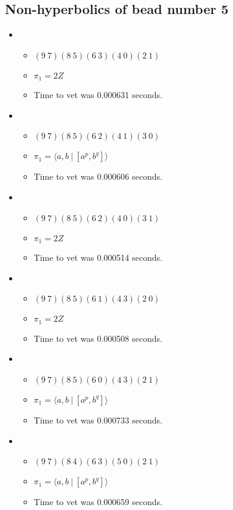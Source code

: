 \documentclass{article}
\begin{document}
\subsection{Non-hyperbolics of bead number 5}
\begin{itemize}
\item \begin{itemize}
      \item $(9\ 7)(8\ 5)(6\ 3)(4\ 0)(2\ 1)$
      \item $\pi_1 =2 Z$
      \item Time to vet was 0.000631 seconds.
\end{itemize}
\item \begin{itemize}
      \item $(9\ 7)(8\ 5)(6\ 2)(4\ 1)(3\ 0)$
      \item $\pi_1 = \langle a,b\ |\ [a^p,b^q]\rangle$
      \item Time to vet was 0.000606 seconds.
\end{itemize}
\item \begin{itemize}
      \item $(9\ 7)(8\ 5)(6\ 2)(4\ 0)(3\ 1)$
      \item $\pi_1 =2 Z$
      \item Time to vet was 0.000514 seconds.
\end{itemize}
\item \begin{itemize}
      \item $(9\ 7)(8\ 5)(6\ 1)(4\ 3)(2\ 0)$
      \item $\pi_1 =2 Z$
      \item Time to vet was 0.000508 seconds.
\end{itemize}
\item \begin{itemize}
      \item $(9\ 7)(8\ 5)(6\ 0)(4\ 3)(2\ 1)$
      \item $\pi_1 = \langle a,b\ |\ [a^p,b^q]\rangle$
      \item Time to vet was 0.000733 seconds.
\end{itemize}
\item \begin{itemize}
      \item $(9\ 7)(8\ 4)(6\ 3)(5\ 0)(2\ 1)$
      \item $\pi_1 = \langle a,b\ |\ [a^p,b^q]\rangle$
      \item Time to vet was 0.000659 seconds.

\end{itemize}
\end{itemize}
\end{document}
